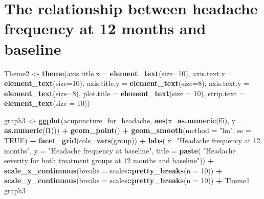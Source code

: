 \documentclass[
]{article}
\newenvironment{Shaded}{\begin{snugshade}}{\end{snugshade}}
\newcommand{\DataTypeTok}[1]{\textcolor[rgb]{0.13,0.29,0.53}{#1}}
\newcommand{\DecValTok}[1]{\textcolor[rgb]{0.00,0.00,0.81}{#1}}
\newcommand{\KeywordTok}[1]{\textcolor[rgb]{0.13,0.29,0.53}{\textbf{#1}}}
\newcommand{\NormalTok}[1]{#1}
\newcommand{\OperatorTok}[1]{\textcolor[rgb]{0.81,0.36,0.00}{\textbf{#1}}}
\newcommand{\OtherTok}[1]{\textcolor[rgb]{0.56,0.35,0.01}{#1}}
\newcommand{\StringTok}[1]{\textcolor[rgb]{0.31,0.60,0.02}{#1}}
\begin{document}
\hypertarget{the-relationship-between-headache-frequency-at-12-months-and-baseline}{%
\section{The relationship between headache frequency at 12 months and
baseline}\label{the-relationship-between-headache-frequency-at-12-months-and-baseline}}

\begin{Shaded}
\begin{Highlighting}[]
\NormalTok{Theme2 <-}\StringTok{ }\KeywordTok{theme}\NormalTok{(}\DataTypeTok{axis.title.x =} \KeywordTok{element_text}\NormalTok{(}\DataTypeTok{size=}\DecValTok{10}\NormalTok{), }
                \DataTypeTok{axis.text.x  =} \KeywordTok{element_text}\NormalTok{(}\DataTypeTok{size=}\DecValTok{10}\NormalTok{), }
                \DataTypeTok{axis.title.y =} \KeywordTok{element_text}\NormalTok{(}\DataTypeTok{size=}\DecValTok{8}\NormalTok{), }
                \DataTypeTok{axis.text.y  =} \KeywordTok{element_text}\NormalTok{(}\DataTypeTok{size=}\DecValTok{8}\NormalTok{), }
                \DataTypeTok{plot.title =} \KeywordTok{element_text}\NormalTok{(}\DataTypeTok{size =} \DecValTok{10}\NormalTok{),}
                \DataTypeTok{strip.text =} \KeywordTok{element_text}\NormalTok{(}\DataTypeTok{size =} \DecValTok{10}\NormalTok{)) }


\NormalTok{graph3 <-}\StringTok{ }\KeywordTok{ggplot}\NormalTok{(acupuncture_for_headache, }\KeywordTok{aes}\NormalTok{(}\DataTypeTok{x=}\KeywordTok{as.numeric}\NormalTok{(f5), }\DataTypeTok{y =} \KeywordTok{as.numeric}\NormalTok{(f1))) }\OperatorTok{+}
\StringTok{  }\KeywordTok{geom_point}\NormalTok{() }\OperatorTok{+}
\StringTok{  }\KeywordTok{geom_smooth}\NormalTok{(}\DataTypeTok{method =} \StringTok{"lm"}\NormalTok{, }\DataTypeTok{se =} \OtherTok{TRUE}\NormalTok{)  }\OperatorTok{+}
\StringTok{  }\KeywordTok{facet_grid}\NormalTok{(}\DataTypeTok{cols=}\KeywordTok{vars}\NormalTok{(group)) }\OperatorTok{+}
\StringTok{  }\KeywordTok{labs}\NormalTok{(}
    \DataTypeTok{x=}\StringTok{"Headache frequency at 12 months"}\NormalTok{, }
    \DataTypeTok{y =} \StringTok{"Headache frequency at baseline"}\NormalTok{, }
    \DataTypeTok{title =} \KeywordTok{paste}\NormalTok{(}
    \StringTok{"Headache severity for both treatment groups at 12 months and baseline"}\NormalTok{)) }\OperatorTok{+}
\StringTok{  }\KeywordTok{scale_x_continuous}\NormalTok{(}\DataTypeTok{breaks =}\NormalTok{ scales}\OperatorTok{::}\KeywordTok{pretty_breaks}\NormalTok{(}\DataTypeTok{n =} \DecValTok{10}\NormalTok{)) }\OperatorTok{+}
\StringTok{  }\KeywordTok{scale_y_continuous}\NormalTok{(}\DataTypeTok{breaks =}\NormalTok{ scales}\OperatorTok{::}\KeywordTok{pretty_breaks}\NormalTok{(}\DataTypeTok{n =} \DecValTok{10}\NormalTok{)) }\OperatorTok{+}
\StringTok{  }\NormalTok{Theme1}
\NormalTok{graph3}
\end{Highlighting}
\end{Shaded}
\end{document}
